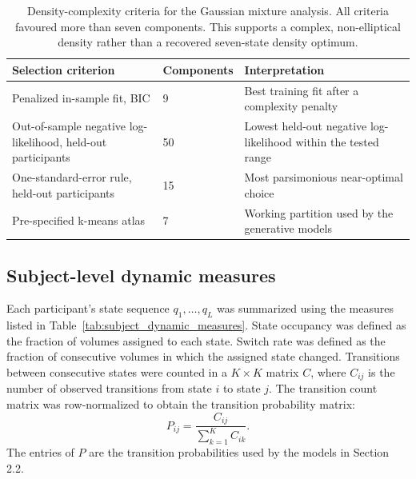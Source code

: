 \documentclass[12pt,a4paper]{report}
\newcommand{\compacttablestyle}{%
  \captionsetup{font=footnotesize,skip=2pt}%
  \small
  \setlength{\tabcolsep}{3pt}%
  \renewcommand{\arraystretch}{0.85}%
}
\begin{document}
\begin{table}[H]
\centering
\compacttablestyle
\caption{Density-complexity criteria for the Gaussian mixture analysis. All criteria favoured more than seven components. This supports a complex, non-elliptical density rather than a recovered seven-state density optimum.}
\label{tab:gmm_density_complexity}
\begin{tabular}{p{} p{} p{}}
\toprule
\textbf{Selection criterion} & \textbf{Components} & \textbf{Interpretation} \\
\midrule
Penalized in-sample fit, BIC & 9 & Best training fit after a complexity penalty \\
Out-of-sample negative log-likelihood, held-out participants
&
50
&
Lowest held-out negative log-likelihood within the tested range \\
One-standard-error rule, held-out participants & 15 & Most parsimonious near-optimal choice \\
Pre-specified k-means atlas & 7 & Working partition used by the generative models \\
\bottomrule
\end{tabular}
\end{table}

\FloatBarrier
\subsection{Subject-level dynamic measures}

Each participant's state sequence $q_1,\ldots,q_L$ was summarized using the measures listed in Table~\ref{tab:subject_dynamic_measures}. State occupancy was defined as the fraction of volumes assigned to each state. Switch rate was defined as the fraction of consecutive volumes in which the assigned state changed. Transitions between consecutive states were counted in a $K \times K$ matrix $C$, where $C_{ij}$ is the number of observed transitions from state $i$ to state $j$. The transition count matrix was row-normalized to obtain the transition probability matrix:
\begin{equation}
P_{ij}
=
\frac{C_{ij}}{\sum_{k=1}^{K}C_{ik}}.
\end{equation}
The entries of $P$ are the transition probabilities used by the models in Section 2.2.
\end{document}
